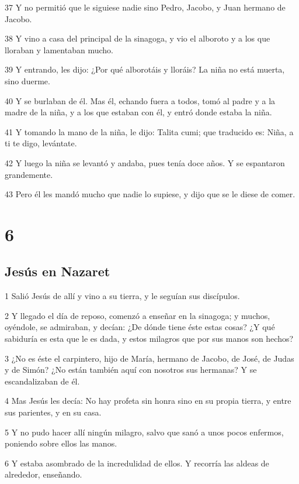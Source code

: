\par 37 Y no permitió que le siguiese nadie sino Pedro, Jacobo, y Juan hermano de Jacobo.
\par 38 Y vino a casa del principal de la sinagoga, y vio el alboroto y a los que lloraban y lamentaban mucho.
\par 39 Y entrando, les dijo: ¿Por qué alborotáis y lloráis? La niña no está muerta, sino duerme.
\par 40 Y se burlaban de él. Mas él, echando fuera a todos, tomó al padre y a la madre de la niña, y a los que estaban con él, y entró donde estaba la niña.
\par 41 Y tomando la mano de la niña, le dijo: Talita cumi; que traducido es: Niña, a ti te digo, levántate.
\par 42 Y luego la niña se levantó y andaba, pues tenía doce años. Y se espantaron grandemente.
\par 43 Pero él les mandó mucho que nadie lo supiese, y dijo que se le diese de comer.

\chapter{6}

\section*{Jesús en Nazaret}

\par 1 Salió Jesús de allí y vino a su tierra, y le seguían sus discípulos.
\par 2 Y llegado el día de reposo, comenzó a enseñar en la sinagoga; y muchos, oyéndole, se admiraban, y decían: ¿De dónde tiene éste estas cosas? ¿Y qué sabiduría es esta que le es dada, y estos milagros que por sus manos son hechos?
\par 3 ¿No es éste el carpintero, hijo de María, hermano de Jacobo, de José, de Judas y de Simón? ¿No están también aquí con nosotros sus hermanas? Y se escandalizaban de él.
\par 4 Mas Jesús les decía: No hay profeta sin honra sino en su propia tierra, y entre sus parientes, y en su casa.
\par 5 Y no pudo hacer allí ningún milagro, salvo que sanó a unos pocos enfermos, poniendo sobre ellos las manos.
\par 6 Y estaba asombrado de la incredulidad de ellos. Y recorría las aldeas de alrededor, enseñando.

